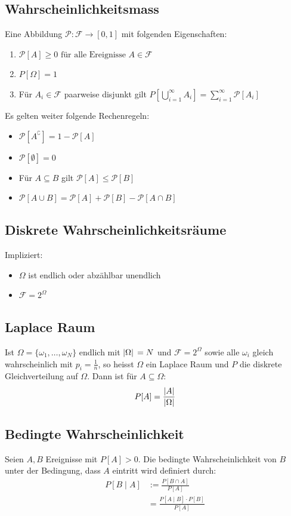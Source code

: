 \documentclass[8pt]{extarticle}
\newcommand{\F}{\mathcal{F}}
\begin{document}
\begin{multicols*}{3}
  \subsection*{Wahrscheinlichkeitsmass}
  Eine Abbildung $\mathcal{P}: \F \to [0, 1]$ mit folgenden
  Eigenschaften:
  \begin{enumerate}[label=(\arabic*)]
    \item $\mathcal{P}[A] \geq 0 \text{ für alle Ereignisse } A \in \F$
    \item $P[\Omega] = 1$
    \item Für $A_i \in \F$ paarweise disjunkt gilt
          $P[\bigcup_{i = 1}^\infty A_i] = \sum_{i = 1}^\infty \mathcal{P}[A_i]$
  \end{enumerate}
  Es gelten weiter folgende Rechenregeln:
  \begin{itemize}
    \item $\mathcal{P}[A^\complement] = 1 - \mathcal{P}[A]$
    \item $\mathcal{P}[\emptyset] = 0$
    \item Für $A \subseteq B$ gilt $\mathcal{P}[A] \leq \mathcal{P}[B]$
    \item $\mathcal{P}[A \cup B] = \mathcal{P}[A] + \mathcal{P}[B] - \mathcal{P}[A \cap B]$
  \end{itemize}
  \subsection*{Diskrete Wahrscheinlichkeitsräume}
  Impliziert:
  \begin{itemize}
    \item $\Omega$ ist endlich oder abzählbar unendlich
    \item $\F = 2^{\Omega}$
  \end{itemize}
  \subsection*{Laplace Raum}
  Ist $\Omega = \{\omega_1, \dots, \omega_N\}$
  endlich mit $\abs*{\Omega} = N$ und $\F = 2^\Omega$
  sowie alle $\omega_i$ gleich wahrscheinlich mit $p_i = \frac{1}{n}$,
  so heisst $\Omega$ ein Laplace Raum und $P$ die diskrete Gleichverteilung
  auf $\Omega$. Dann ist für $A \subseteq \Omega$:
  \begin{align*}
    P[A] = \frac{\abs{A}}{\abs{\Omega}}
  \end{align*}
  \subsection*{Bedingte Wahrscheinlichkeit}
  Seien $A, B$ Ereignisse mit $P[A] > 0$. Die bedingte Wahrscheinlichkeit
  von $B$ unter der Bedingung, dass $A$ eintritt wird definiert durch:
  \begin{align*}
    P[B \;|\; A] & := \frac{P[B \cap A]}{P[A]}            \\
                 & = \frac{P[A \;|\; B] \cdot P[B]}{P[A]}
  \end{align*}

\end{multicols*}
\end{document}

